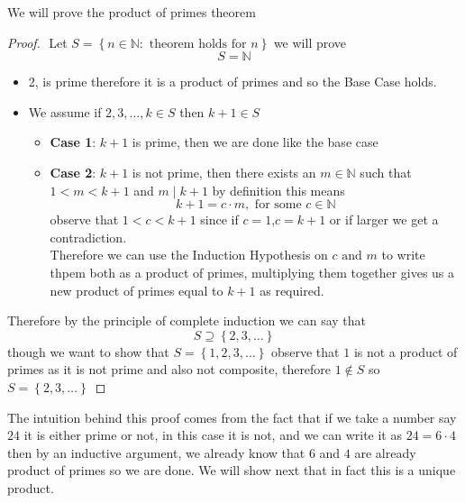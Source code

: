 \documentclass[11pt]{book}
\begin{document}
We will prove the product of primes theorem
\begin{proof}
$ $\newline
    Let $S= \left\{ n \in \mathbb{N} : \text{ theorem holds for } n \right\} $ we will prove 
    \[
    S= \mathbb{N} 
    \]
    \begin{itemize}
        \item 2, is prime therefore it is a product of primes and so the Base Case holds. 
        \item We assume if $2, 3, \ldots , k \in S$ then $k + 1 \in S$ 
            \begin{itemize}
                \item \textbf{Case 1}: $k + 1$ is prime, then we are done like the base case
                \item \textbf{Case 2}: $k + 1$  is not prime, then there exists an $m \in \mathbb{N} $ such that $1 < m < k + 1$ and $m \mid k + 1$ by definition this means 
                    \[
                    k + 1 = c \cdot m, \text{ for some } c \in \mathbb{N} 
                    \]
                    observe that $1 < c < k + 1$ since if $c = 1$,$c= k + 1$ or if larger we get a contradiction.\\
                    Therefore we can use the Induction Hypothesis on $c \text{ and } m$ to write thpem both as a product of primes, multiplying them together gives us a new product of primes equal  to $k + 1$ as required. 
            \end{itemize}
    \end{itemize}
Therefore by the principle of complete induction we can say that 
\[
S \supseteq \left\{ 2, 3, \ldots  \right\} 
\]
though we want to show that $S= \left\{ 1, 2,3, \ldots  \right\} $ observe  that $1$ is not a product of primes as it is not prime and also not composite, therefore $1 \not\in S$ so $S= \left\{ 2, 3, \ldots  \right\} $  
\end{proof}

The intuition behind this proof comes from the fact that if we take a number say $24$ it is either prime  or not, in this case it is not, and we can write it as $24 = 6  \cdot 4$ then by an inductive argument, we already know that $6 $  and $4$ are already product of primes so we are done. We will show next that in fact this is a unique product.


\end{document}
